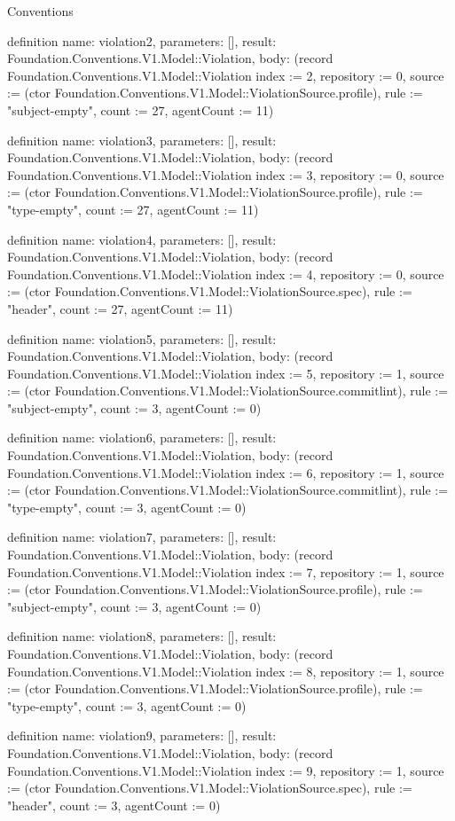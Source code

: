 \begin{lexlean}{Conventions}
\begin{semanticmodule}
definition{
  name: violation2,
  parameters: [],
  result: Foundation.Conventions.V1.Model::Violation,
  body: (record Foundation.Conventions.V1.Model::Violation {index := 2, repository := 0, source := (ctor Foundation.Conventions.V1.Model::ViolationSource.profile), rule := "subject-empty", count := 27, agentCount := 11})
}

definition{
  name: violation3,
  parameters: [],
  result: Foundation.Conventions.V1.Model::Violation,
  body: (record Foundation.Conventions.V1.Model::Violation {index := 3, repository := 0, source := (ctor Foundation.Conventions.V1.Model::ViolationSource.profile), rule := "type-empty", count := 27, agentCount := 11})
}

definition{
  name: violation4,
  parameters: [],
  result: Foundation.Conventions.V1.Model::Violation,
  body: (record Foundation.Conventions.V1.Model::Violation {index := 4, repository := 0, source := (ctor Foundation.Conventions.V1.Model::ViolationSource.spec), rule := "header", count := 27, agentCount := 11})
}

definition{
  name: violation5,
  parameters: [],
  result: Foundation.Conventions.V1.Model::Violation,
  body: (record Foundation.Conventions.V1.Model::Violation {index := 5, repository := 1, source := (ctor Foundation.Conventions.V1.Model::ViolationSource.commitlint), rule := "subject-empty", count := 3, agentCount := 0})
}

definition{
  name: violation6,
  parameters: [],
  result: Foundation.Conventions.V1.Model::Violation,
  body: (record Foundation.Conventions.V1.Model::Violation {index := 6, repository := 1, source := (ctor Foundation.Conventions.V1.Model::ViolationSource.commitlint), rule := "type-empty", count := 3, agentCount := 0})
}

definition{
  name: violation7,
  parameters: [],
  result: Foundation.Conventions.V1.Model::Violation,
  body: (record Foundation.Conventions.V1.Model::Violation {index := 7, repository := 1, source := (ctor Foundation.Conventions.V1.Model::ViolationSource.profile), rule := "subject-empty", count := 3, agentCount := 0})
}

definition{
  name: violation8,
  parameters: [],
  result: Foundation.Conventions.V1.Model::Violation,
  body: (record Foundation.Conventions.V1.Model::Violation {index := 8, repository := 1, source := (ctor Foundation.Conventions.V1.Model::ViolationSource.profile), rule := "type-empty", count := 3, agentCount := 0})
}

definition{
  name: violation9,
  parameters: [],
  result: Foundation.Conventions.V1.Model::Violation,
  body: (record Foundation.Conventions.V1.Model::Violation {index := 9, repository := 1, source := (ctor Foundation.Conventions.V1.Model::ViolationSource.spec), rule := "header", count := 3, agentCount := 0})
}


\end{semanticmodule}
\end{lexlean}
